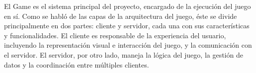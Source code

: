 El Game es el sistema principal del proyecto, encargado de la ejecución del juego en sí. 
Como se habló de las capas de la arquitectura del juego, éste se divide principalmente en dos partes: 
cliente y servidor, cada una con sus características y funcionalidades. El cliente es responsable de la 
experiencia del usuario, incluyendo la representación visual e interacción del juego, y la comunicación con el 
servidor. El servidor, por otro lado, maneja la lógica del juego, la gestión de datos y la coordinación 
entre múltiples clientes.
